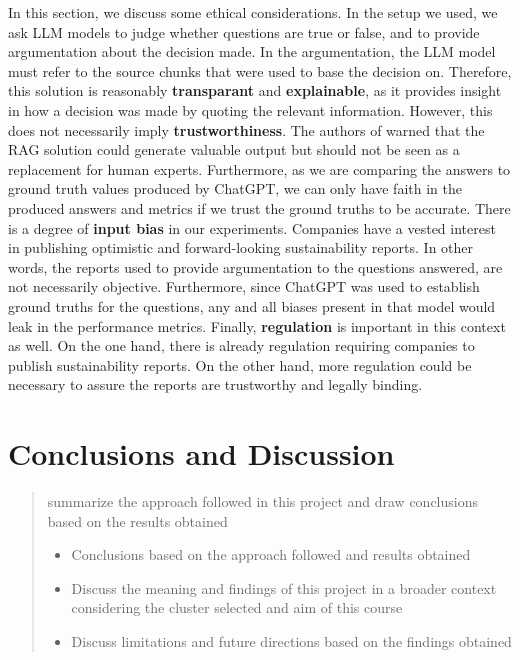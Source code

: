 \documentclass[]{article}
\begin{document}
In this section, we discuss some ethical considerations.
In the setup we used, we ask LLM models to judge whether questions are true or false, and to provide argumentation about the decision made.
In the argumentation, the LLM model must refer to the source chunks that were used to base the decision on.
Therefore, this solution is reasonably \textbf{transparant} and \textbf{explainable}, as it provides insight in how a decision was made by quoting the relevant information.
However, this does not necessarily imply \textbf{trustworthiness}.
The authors of \cite{durability} warned that the RAG solution could generate valuable output but should not be seen as a replacement for human experts.
Furthermore, as we are comparing the answers to ground truth values produced by ChatGPT, we can only have faith in the produced answers and metrics if we trust the ground truths to be accurate.
There is a degree of \textbf{input bias} in our experiments.
Companies have a vested interest in publishing optimistic and forward-looking sustainability reports.
In other words, the reports used to provide argumentation to the questions answered, are not necessarily objective.
Furthermore, since ChatGPT was used to establish ground truths for the questions, any and all biases present in that model would leak in the performance metrics.
Finally, \textbf{regulation} is important in this context as well.
On the one hand, there is already regulation requiring companies to publish sustainability reports.
On the other hand, more regulation could be necessary to assure the reports are trustworthy and legally binding.

\section{Conclusions and Discussion} \label{sec:conclusions}

\begin{quotation}
    summarize the approach followed in this project and draw conclusions based on the results obtained
    \begin{itemize}
        \item Conclusions based on the approach followed and results obtained
        \item Discuss the meaning and findings of this project in a broader context considering the cluster selected and aim of this course
        \item Discuss limitations and future directions based on the findings obtained
    \end{itemize}
\end{quotation}

\printbibliography
\end{document}

